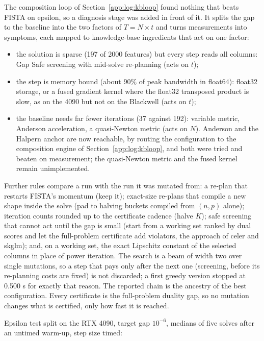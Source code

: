 \documentclass[11pt]{article}
\begin{document}
The composition loop of Section~\ref{app:log:kbloop} found nothing that beats
FISTA on epsilon, so a diagnosis stage was added in front of it. It splits the
gap to the baseline into the two factors of $T = N \times t$ and turns
measurements into symptoms, each mapped to knowledge-base ingredients that act
on one factor:
\begin{itemize}
\item the solution is sparse (197 of 2000 features) but every step reads all
 columns: Gap Safe screening with mid-solve re-planning (acts on $t$);
\item the step is memory bound (about 90\% of peak bandwidth in float64):
 float32 storage, or a fused gradient kernel where the float32 transposed
 product is slow, as on the 4090 but not on the Blackwell (acts on $t$);
\item the baseline needs far fewer iterations (37 against 192): variable
 metric, Anderson acceleration, a quasi-Newton metric (acts on $N$). Anderson
 and the Halpern anchor are now reachable, by routing the configuration to the
 composition engine of Section~\ref{app:log:kbloop}, and both were tried and
 beaten on measurement; the quasi-Newton metric and the fused kernel remain
 unimplemented.
\end{itemize}
Further rules compare a run with the run it was mutated from: a re-plan that
restarts FISTA's momentum (keep it); exact-size re-plans that compile a new
shape inside the solve (pad to halving buckets compiled from $(n, p)$ alone);
iteration counts rounded up to the certificate cadence (halve $K$); safe
screening that cannot act until the gap is small (start from a working set
ranked by dual scores and let the full-problem certificate add violators, the
approach of celer and skglm); and, on a working set, the exact Lipschitz
constant of the selected columns in place of power iteration. The search is a
beam of width two over single mutations, so a step that pays only after the
next one (screening, before its re-planning costs are fixed) is not discarded;
a first greedy version stopped at 0.500 s for exactly that reason. The
reported chain is the ancestry of the best configuration. Every certificate is
the full-problem duality gap, so no mutation changes what is certified, only how
fast it is reached.

Epsilon test split on the RTX 4090, target gap $10^{-6}$, medians of five
solves after an untimed warm-up, step size timed:
\end{document}
